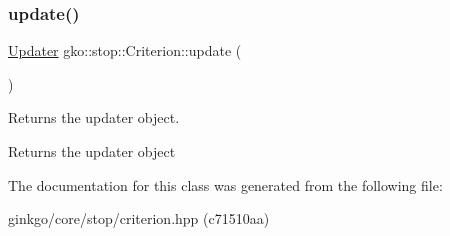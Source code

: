 \subsubsection{\texorpdfstring{update()}{update()}}
{\footnotesize\ttfamily \hyperlink{classgko_1_1stop_1_1Criterion_1_1Updater}{Updater} gko\+::stop\+::\+Criterion\+::update (\begin{DoxyParamCaption}{ }\end{DoxyParamCaption})\hspace{0.3cm}{\ttfamily [inline]}}



Returns the updater object. 

\begin{DoxyReturn}{Returns}
the updater object 
\end{DoxyReturn}


The documentation for this class was generated from the following file\+:\begin{DoxyCompactItemize}
\item 
ginkgo/core/stop/criterion.\+hpp (c71510aa)\end{DoxyCompactItemize}
